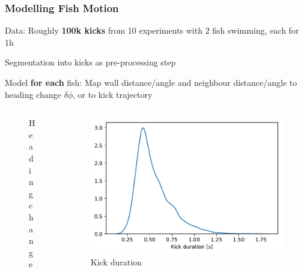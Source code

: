 \documentclass{beamer}
\begin{document}
\begin{frame}
  \frametitle{Modelling Fish Motion}
Data: Roughly \textbf{100k kicks} from 10 experiments with 2 fish swimming, each for 1h

Segmentation into kicks as pre-processing step

Model \textbf{for each} fish: Map wall distance/angle and neighbour distance/angle to heading change $\delta \phi$, or to kick trajectory
\begin{columns}
  \begin{column}{0.24\linewidth}
    \begin{figure}[h]
      \centering
 \caption*{Heading change}
\end{figure}
\end{column}

\begin{column}{0.4\linewidth}
  \begin{figure}[h]
    \centering
\includegraphics[clip, width=0.8\linewidth]{kick_duration.pdf}
    \caption*{Kick duration}
  \end{figure}
\end{column}


\end{columns}
\end{frame}
\end{document}
